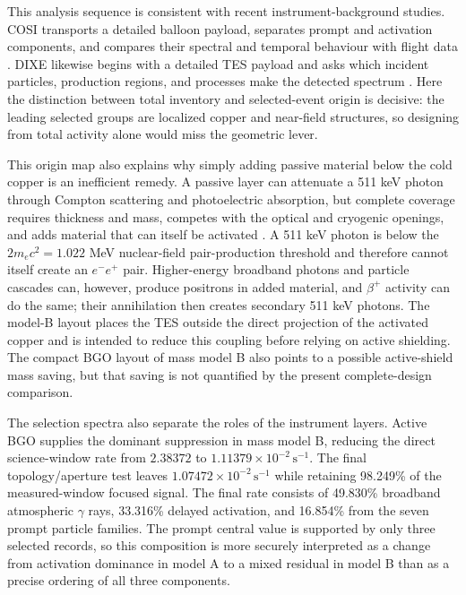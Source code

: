 \documentclass[11pt]{article}
\newcommand{\cps}{\ensuremath{\,\mathrm{s^{-1}}}}
\begin{document}
This analysis sequence is consistent with recent instrument-background studies.
COSI transports a detailed balloon payload, separates prompt and activation
components, and compares their spectral and temporal behaviour with flight data
\cite{Gallego2025Balloon}. DIXE likewise begins with a detailed TES payload and
asks which incident particles, production regions, and processes make the
detected spectrum \cite{Tian2026DIXE}. Here the distinction between total
inventory and selected-event origin is decisive: the leading selected groups are
localized copper and near-field structures, so designing from total activity
alone would miss the geometric lever.

This origin map also explains why simply adding passive material below the cold
copper is an inefficient remedy. A passive layer can attenuate a 511 keV photon
through Compton scattering and photoelectric absorption, but complete coverage
requires thickness and mass, competes with the optical and cryogenic openings,
and adds material that can itself be activated \cite{NISTXCOM}. A 511 keV
photon is below the $2m_ec^2=1.022$ MeV nuclear-field pair-production
threshold and therefore cannot itself create an $e^-e^+$ pair. Higher-energy
broadband photons and particle cascades can, however, produce positrons in added
material, and $\beta^+$ activity can do the same; their annihilation then
creates secondary 511 keV photons. The model-B layout places the TES outside the
direct projection of the activated copper and is intended to reduce this coupling
before relying on active shielding. The compact BGO layout of mass model B also points
to a possible active-shield mass saving, but that saving is not quantified by
the present complete-design comparison.

The selection spectra also separate the roles of the instrument layers. Active
BGO supplies the dominant suppression in mass model B, reducing the direct
science-window rate from $2.38372$ to $1.11379\times10^{-2}\cps$. The final
topology/aperture test leaves $1.07472\times10^{-2}\cps$ while retaining
98.249\% of the measured-window focused signal. The final rate consists of
49.830\% broadband atmospheric $\gamma$ rays, 33.316\% delayed activation, and 16.854\%
from the seven prompt particle families. The prompt central value is supported
by only three selected records, so this composition is more securely interpreted
as a change from activation dominance in model A to a mixed residual in model B
than as a precise ordering of all three components.
\end{document}
